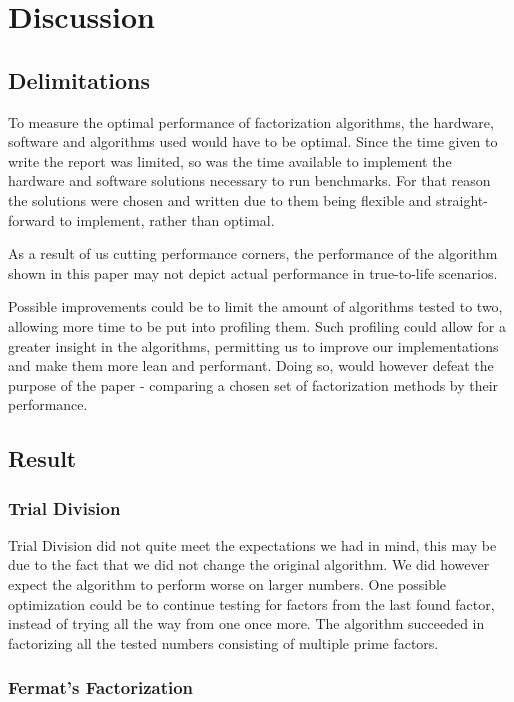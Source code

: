\chapter{Discussion}

\section{Delimitations}
To measure the optimal performance of factorization algorithms, the hardware, software and algorithms used would have to be optimal. Since the time given to write the report was limited, so was the time available to implement the hardware and software solutions necessary to run benchmarks. For that reason the solutions were chosen and written due to them being flexible and straight-forward to implement, rather than optimal.

As a result of us cutting performance corners, the performance of the algorithm shown in this paper may not depict actual performance in true-to-life scenarios.

Possible improvements could be to limit the amount of algorithms tested to two, allowing more time to be put into profiling them. Such profiling could allow for a greater insight in the algorithms, permitting us to improve our implementations and make them more lean and performant. Doing so, would however defeat the purpose of the paper - comparing a chosen set of factorization methods by their performance.

\section{Result}

\subsection{Trial Division}

Trial Division did not quite meet the expectations we had in mind, this may be due to the fact that we did not change the original algorithm. We did however expect the algorithm to perform worse on larger numbers. One possible optimization could be to continue testing for factors from the last found factor, instead of trying all the way from one once more. The algorithm succeeded in factorizing all the tested numbers consisting of multiple prime factors.

\subsection{Fermat's Factorization}

